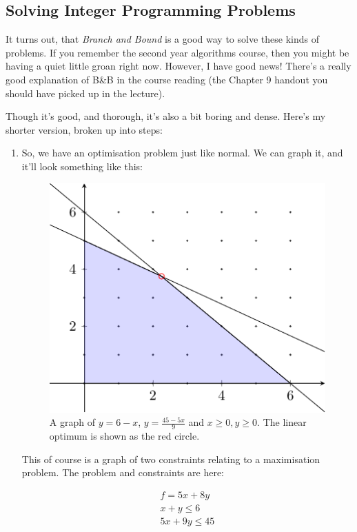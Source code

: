 \subsection{Solving Integer Programming Problems}

It turns out, that \textit{Branch and Bound} is a good way to solve these kinds
of problems. If you remember the second year algorithms course, then you might
be having a quiet little groan right now. However, I have good news! There's a
really good explanation of B\&B in the course reading (the Chapter 9 handout you
should have picked up in the lecture).

Though it's good, and thorough, it's also a bit boring and dense. Here's my
shorter version, broken up into steps:

\begin{enumerate}
  \item So, we have an optimisation problem just like normal. We can graph it, 
  and it'll look something like this:

  \begin{figure}[H]
    \centering
    \includegraphics{diagrams/graph5}
    \caption{A graph of $y = 6 - x$, $y = \frac{45 - 5x}{9}$ and $x \geq 0,
      y \geq 0$. The linear optimum is shown as the red circle.}
    \label{fig:graph-5}
  \end{figure}

  This of course is a graph of two constraints relating to a maximisation
  problem. The problem and constraints are here:

  \[
    \begin{split}
      f = 5x + 8y\\
      x + y \leq 6\\
      5x + 9y \leq 45
    \end{split}
  \]


\end{enumerate}
